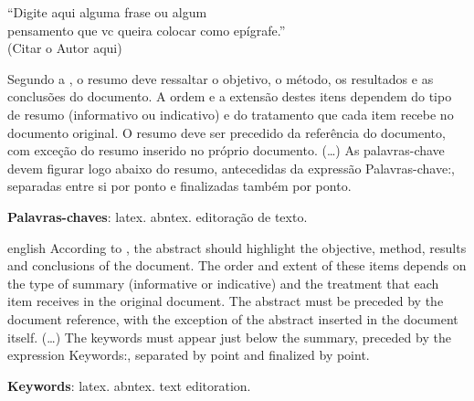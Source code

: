\documentclass[12pt,oneside,a4paper,chapter=TITLE,
			   english,brazil]{abntex2}
\begin{document}
\begin{epigrafe}
    \vspace*{\fill}
	\begin{flushright}
		``Digite aqui alguma frase ou algum \\
		pensamento que vc queira colocar como epígrafe.'' \\
		(Citar o Autor aqui)
	\end{flushright}
\end{epigrafe}



\setlength{\absparsep}{18pt} %
\begin{resumo}
 Segundo a , o resumo deve ressaltar o objetivo, o método, os resultados e as conclusões do documento. A ordem e a extensão destes itens dependem do tipo de resumo (informativo ou indicativo) e do tratamento que cada item recebe no documento original. O resumo deve ser precedido da referência do documento, com exceção do resumo inserido no próprio documento. (\ldots) As palavras-chave devem figurar logo abaixo do resumo, antecedidas da expressão Palavras-chave:, separadas entre si por ponto e finalizadas também por ponto.

 \textbf{Palavras-chaves}: latex. abntex. editoração de texto.
\end{resumo}

\begin{resumo}[Abstract]
 \begin{otherlanguage*}{english}
   According to , the abstract should highlight the objective, method, results and conclusions of the document. The order and extent of these items depends on the type of summary (informative or indicative) and the treatment that each item receives in the original document. The abstract must be preceded by the document reference, with the exception of the abstract inserted in the document itself. (\ldots) The keywords must appear just below the summary, preceded by the expression Keywords:, separated by point and finalized by point.
 
   \textbf{Keywords}: latex. abntex. text editoration.
 \end{otherlanguage*}
\end{resumo}
\end{document}

